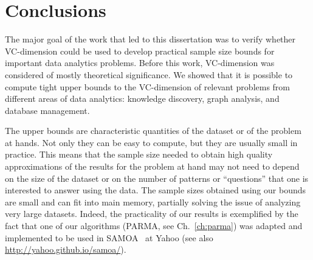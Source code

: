 \chapter{Conclusions}\label{ch:conclusions}

The major goal of the work that led to this dissertation was to verify whether
VC-dimension could be used to develop practical sample size bounds for important
data analytics problems. Before this work, VC-dimension was considered of mostly
theoretical significance. We showed that it is possible to compute tight upper
bounds to the VC-dimension of relevant problems from different areas of data
analytics: knowledge discovery, graph analysis, and database management. 

The upper bounds are characteristic quantities of the dataset or of the
problem at hands. Not only they can be easy to compute, but they are usually
small in practice. This means that the sample size needed to obtain high quality
approximations of the results for the problem at hand may not need to depend on
the size of the dataset or on the number of patterns or ``questions'' that one
is interested to answer using the data. The sample sizes obtained using our
bounds are small and can fit into main memory, partially solving the issue of
analyzing very large datasets. Indeed, the practicality of our results is
exemplified by the fact that one of our algorithms (PARMA, see
Ch.~\ref{ch:parma}) was adapted and implemented to be used in
SAMOA~\citep{DFMorales13} at Yahoo (see also \url{http://yahoo.github.io/samoa/}).

